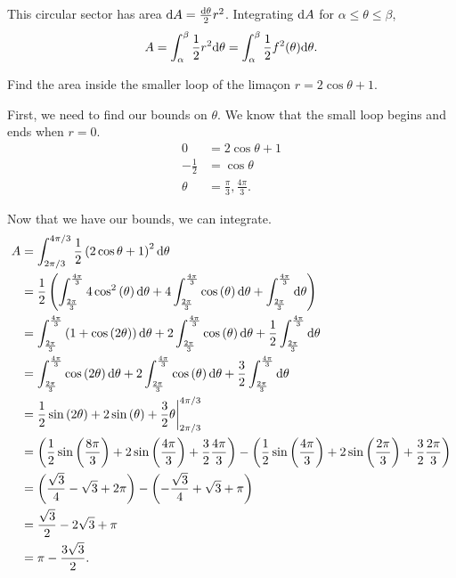 This circular sector has area $\mathrm{d} A = \frac{\mathrm{d} \theta}{2}r^2$.
Integrating $\mathrm{d} A$ for $\alpha \leq \theta \leq \beta$,
\begin{equation*}
	A = \int_{\alpha}^{\beta}{\frac{1}{2}r^2\mathrm{d} \theta} = \int_{\alpha}^{\beta}{\frac{1}{2}f^2(\theta)\mathrm{d} \theta}.
\end{equation*}

\begin{example}
	Find the area inside the smaller loop of the lima\c{c}on $r=2\cos{\theta}+1$.
\end{example}
\begin{answer}
	First, we need to find our bounds on $\theta$.
	We know that the small loop begins and ends when $r=0$.
	\begin{align*}
		0 &= 2\cos{\theta}+1 \\
		-\frac{1}{2} &= \cos{\theta} \\
		\theta &= \frac{\pi}{3}, \frac{4\pi}{3}.
	\end{align*}
	
	Now that we have our bounds, we can integrate.
	\begin{align*}
		A &= \int_{2\pi/3}^{4\pi/3}{\frac{1}{2}\left(2\cos{\theta}+1\right)^2\mathrm{d} \theta} \\
		&= \frac{1}{2}\left(\int_{\frac{2\pi}{3}}^{\frac{4\pi}{3}}4\cos^{2}\left(\theta\right)\mathrm{d} \theta+4\int_{\frac{2\pi}{3}}^{\frac{4\pi}{3}}\cos\left(\theta\right)\mathrm{d} \theta+\int_{\frac{2\pi}{3}}^{\frac{4\pi}{3}}\mathrm{d} \theta\right) \\
		&= \int_{\frac{2\pi}{3}}^{\frac{4\pi}{3}}\left(1+\cos\left(2\theta\right)\right)\mathrm{d} \theta+2\int_{\frac{2\pi}{3}}^{\frac{4\pi}{3}}\cos\left(\theta\right)\mathrm{d} \theta+\frac{1}{2}\int_{\frac{2\pi}{3}}^{\frac{4\pi}{3}}\mathrm{d} \theta \\
		&= \int_{\frac{2\pi}{3}}^{\frac{4\pi}{3}}\cos\left(2\theta\right)\mathrm{d} \theta+2\int_{\frac{2\pi}{3}}^{\frac{4\pi}{3}}\cos\left(\theta\right)\mathrm{d} \theta+\frac{3}{2}\int_{\frac{2\pi}{3}}^{\frac{4\pi}{3}}\mathrm{d} \theta \\
		&= \frac{1}{2}\sin\left(2\theta\right)+2\sin\left(\theta\right)+\frac{3}{2}\theta \biggr\rvert_{2\pi/3}^{4\pi/3} \\
		&= \left(\frac{1}{2}\sin\left(\frac{8\pi}{3}\right)+2\sin\left(\frac{4\pi}{3}\right)+\frac{3}{2}\frac{4\pi}{3}\right)-\left(\frac{1}{2}\sin\left(\frac{4\pi}{3}\right)+2\sin\left(\frac{2\pi}{3}\right)+\frac{3}{2}\frac{2\pi}{3}\right) \\
		&= \left(\frac{\sqrt{3}}{4}-\sqrt{3}+2\pi\right)-\left(-\frac{\sqrt{3}}{4}+\sqrt{3}+\pi\right) \\
		&= \frac{\sqrt{3}}{2}-2\sqrt{3}+\pi \\
		&= \pi-\frac{3\sqrt{3}}{2}.
	\end{align*}
\end{answer}

